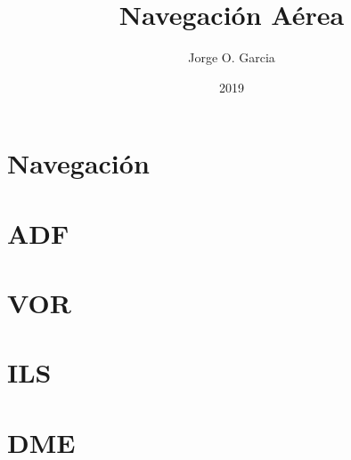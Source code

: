 \documentclass[a4paper,10pt,twoside]{book}
\title{Navegaci\'on A\'erea}
\author{Jorge O. Garcia}
\date{2019}
\begin{document}

\thispagestyle{fancy}
\maketitle

\newpage

\thispagestyle{fancy}
\tableofcontents

\newpage


\chapter{Navegaci\'on}
\label{sec:navegacion}

%


\chapter{ADF}
\label{sec:adf}



\chapter{VOR}
\label{sec:vor}



\chapter{ILS}
\label{sec:ils}



\chapter{DME}
\label{sec:d,e}
\end{document}

